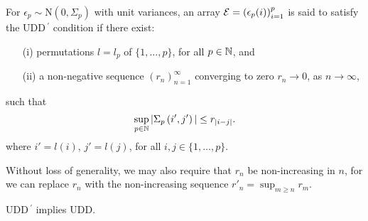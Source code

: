 \begin{definition}\label{d:UDD-prime}
For $\epsilon_p \sim \mathrm{N}(0,\Sigma_p)$ with unit variances, an array ${\cal E} = \left(\epsilon_p(i)\right)_{i=1}^p$ is said to satisfy the UDD\,$^\prime$ condition if there 
exist:
\begin{enumerate}
    \item[(i)] permutations $l = l_p$ of $\{1,\ldots,p\}$, for all $p\in\mathbb N$, and
    \item[(ii)] a non-negative sequence $(r_n)_{n=1}^\infty$ converging to zero $r_n\to 0$, as $n\to\infty$,
\end{enumerate}
such that 
\begin{equation} \label{eq:weak-correlation}
    \sup_{p\in\mathbb N} |\Sigma_p\left(i',j'\right)| \le r_{|i-j|}.
\end{equation}
where $i' = l(i)$, $j' = l(j)$, for all $i,j\in\{1,\ldots,p\}$.
\end{definition}

\begin{remark}
Without loss of generality, we may also require that $r_n$ be non-increasing in $n$, for we can replace $r_n$ with the non-increasing sequence $r'_n = \sup_{m\ge n} r_m$.
\end{remark}

\begin{proposition} \label{prop:UDD-equivalent}
UDD\,$^\prime$ implies UDD.
\end{proposition} 

